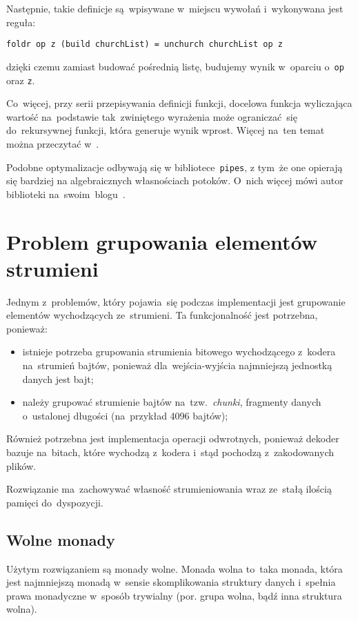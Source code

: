 \documentclass[../../praca.tex]{subfiles}
\begin{document}
Następnie, takie definicje są~wpisywane w~miejscu wywołań i~wykonywana jest reguła:
\begin{verbatim}
foldr op z (build churchList) = unchurch churchList op z
\end{verbatim}
dzięki czemu zamiast budować pośrednią listę, budujemy wynik
w~oparciu o~\texttt{op} oraz \texttt{z}.

Co~więcej, przy serii przepisywania definicji funkcji, docelowa funkcja wyliczająca
wartość na~podstawie tak~zwiniętego wyrażenia może ograniczać~się do~rekursywnej funkcji,
która generuje wynik wprost. Więcej na~ten temat można przeczytać w~\cite{Gill:SCD}.

Podobne optymalizacje odbywają się w bibliotece~\texttt{pipes}, z tym~że one opierają się
bardziej na algebraicznych własnościach potoków. O~nich więcej mówi autor biblioteki
na~swoim~blogu~\cite{Gonzalez:SFP}.

\section{Problem grupowania elementów strumieni}

Jednym z~problemów, który pojawia~się podczas implementacji jest grupowanie elementów
wychodzących ze~strumieni. Ta funkcjonalność jest potrzebna, ponieważ:
\begin{itemize}
  \item istnieje potrzeba grupowania strumienia bitowego wychodzącego z~kodera
    na~strumień bajtów, ponieważ dla~wejścia-wyjścia najmniejszą jednostką danych
    jest bajt;
  \item należy grupować strumienie bajtów na~tzw.~\emph{chunki}, fragmenty
    danych o~ustalonej długości (na~przykład 4096 bajtów);
\end{itemize}
Również potrzebna jest implementacja operacji odwrotnych, ponieważ dekoder
bazuje na~bitach, które wychodzą z~kodera i~stąd pochodzą z~zakodowanych plików.

Rozwiązanie ma~zachowywać własność strumieniowania wraz ze~stałą ilością pamięci
do~dyspozycji.

\subsection{Wolne monady}

Użytym rozwiązaniem są monady wolne. Monada wolna to~taka monada, która
jest najmniejszą monadą w~sensie skomplikowania struktury danych i~spełnia 
prawa monadyczne w~sposób trywialny (por. grupa wolna, bądź
inna struktura wolna).
\end{document}
